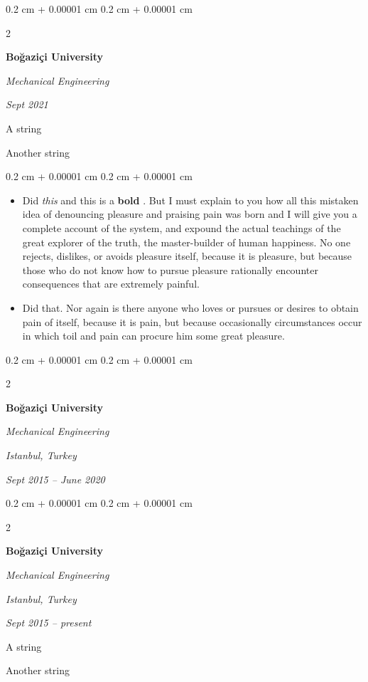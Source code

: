 \documentclass[10pt, letterpaper]{article}
\newenvironment{summary}{
    \begin{description}[
        topsep=0.10 cm,
        parsep=0.10 cm,
        partopsep=0pt,
        itemsep=0pt,
        leftmargin=0.4 cm + 10pt
    ]
}{
    \end{description}
} %
\newenvironment{highlights}{
    \begin{itemize}[
        topsep=0.10 cm,
        parsep=0.10 cm,
        partopsep=0pt,
        itemsep=0pt,
        leftmargin=0.4 cm + 10pt
    ]
}{
    \end{itemize}
} %
\newenvironment{onecolentry}{
    \begin{adjustwidth}{
        0.2 cm + 0.00001 cm
    }{
        0.2 cm + 0.00001 cm
    }
}{
    \end{adjustwidth}
} %
\newenvironment{twocolentry}[2][]{
    \onecolentry
    \def\secondColumn{#2}
    \setcolumnwidth{\fill, 4.5 cm}
    \begin{paracol}{2}
}{
    \switchcolumn \raggedleft \secondColumn
    \end{paracol}
    \endonecolentry
} %
\let\hrefWithoutArrow\href
\renewcommand{\href}[2]{\hrefWithoutArrow{#1}{\ifthenelse{\equal{#2}{}}{ }{#2 }\raisebox{.15ex}{\footnotesize \faExternalLink*}}}
\begin{document}
        \begin{twocolentry}{
            
            
        \textit{Sept 2021}}
            \textbf{Boğaziçi University}

            \textit{Mechanical Engineering}
        \end{twocolentry}
            \begin{summary}
                \item A string
                \item Another string
            \end{summary}
        \vspace{0.10 cm}
        \begin{onecolentry}
            \begin{highlights}
                \item Did \textit{this} and this is a \textbf{bold} \href{https://example.com}{link}. But I must explain to you how all this mistaken idea of denouncing pleasure and praising pain was born and I will give you a complete account of the system, and expound the actual teachings of the great explorer of the truth, the master-builder of human happiness. No one rejects, dislikes, or avoids pleasure itself, because it is pleasure, but because those who do not know how to pursue pleasure rationally encounter consequences that are extremely painful.
                \item Did that. Nor again is there anyone who loves or pursues or desires to obtain pain of itself, because it is pain, but because occasionally circumstances occur in which toil and pain can procure him some great pleasure.
            \end{highlights}
        \end{onecolentry}


        \vspace{0.2 cm}

        \begin{twocolentry}{
        \textit{Istanbul, Turkey}    
            
        \textit{Sept 2015 – June 2020}}
            \textbf{Boğaziçi University}

            \textit{Mechanical Engineering}
        \end{twocolentry}


        \vspace{0.2 cm}

        \begin{twocolentry}{
        \textit{Istanbul, Turkey}    
            
        \textit{Sept 2015 – present}}
            \textbf{Boğaziçi University}

            \textit{Mechanical Engineering}
        \end{twocolentry}
            \begin{summary}
                \item A string
                \item Another string
            \end{summary}
\end{document}
